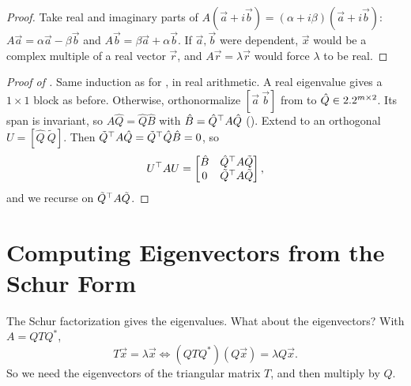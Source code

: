 \begin{proof}
  Take real and imaginary parts of $A(\vec{a} + i\vec{b}) = (\alpha + i\beta)(\vec{a} + i\vec{b})$: $A\vec{a} = \alpha\vec{a} - \beta\vec{b}$ and $A\vec{b} = \beta\vec{a} + \alpha\vec{b}$. If $\vec{a}, \vec{b}$ were dependent, $\vec{x}$ would be a complex multiple of a real vector $\vec{r}$, and $A\vec{r} = \lambda\vec{r}$ would force $\lambda$ to be real.
\end{proof}

\begin{proof}[Proof of ]
  Same induction as for , in real arithmetic. A real eigenvalue gives a $1 \times 1$ block as before. Otherwise, orthonormalize $[\vec{a}\ \vec{b}]$ from  to $\hat{Q} \in 2.2^{m \times 2}$. Its span is invariant, so $A\hat{Q} = \hat{Q}\hat{B}$ with $\hat{B} = \hat{Q}^\top A\hat{Q}$ (). Extend to an orthogonal $U = [\hat{Q}\ \tilde{Q}]$. Then $\tilde{Q}^\top A\hat{Q} = \tilde{Q}^\top\hat{Q}\hat{B} = 0$, so
  \begin{equation}
    U^\top AU = \begin{bmatrix} \hat{B} & \hat{Q}^\top A\tilde{Q} \\ 0 & \tilde{Q}^\top A\tilde{Q} \end{bmatrix},
  \end{equation}
  and we recurse on $\tilde{Q}^\top A\tilde{Q}$.
\end{proof}

\section{Computing Eigenvectors from the Schur Form}
\label{sec:schur-eigvec}

The Schur factorization gives the eigenvalues. What about the eigenvectors? With $A = QTQ^\ast$,
\begin{equation}
  T\vec{x} = \lambda\vec{x} \iff (QTQ^\ast)(Q\vec{x}) = \lambda Q\vec{x}.
\end{equation}
So we need the eigenvectors of the triangular matrix $T$, and then multiply by $Q$.

